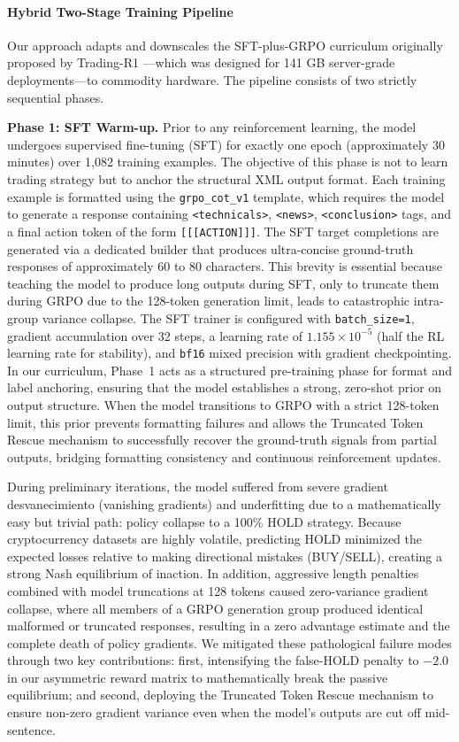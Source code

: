     \paragraph{Hybrid Two-Stage Training Pipeline}

    Our approach adapts and downscales the SFT-plus-GRPO curriculum originally proposed by Trading-R1 \cite{xiao2025tradingr1}---which was designed for 141 GB server-grade deployments---to commodity hardware. The pipeline consists of two strictly sequential phases.

    \textbf{Phase 1: SFT Warm-up.} Prior to any reinforcement learning, the model undergoes supervised fine-tuning (SFT) for exactly one epoch (approximately 30 minutes) over 1,082 training examples. The objective of this phase is not to learn trading strategy but to anchor the structural XML output format. Each training example is formatted using the \texttt{grpo\_cot\_v1} template, which requires the model to generate a response containing \texttt{<technicals>}, \texttt{<news>}, \texttt{<conclusion>} tags, and a final action token of the form \texttt{[[[ACTION]]]}. The SFT target completions are generated via a dedicated builder that produces ultra-concise ground-truth responses of approximately 60 to 80 characters. This brevity is essential because teaching the model to produce long outputs during SFT, only to truncate them during GRPO due to the 128-token generation limit, leads to catastrophic intra-group variance collapse. The SFT trainer is configured with \texttt{batch\_size=1}, gradient accumulation over 32 steps, a learning rate of $1.155\times10^{-5}$ (half the RL learning rate for stability), and \texttt{bf16} mixed precision with gradient checkpointing. In our curriculum, Phase~1 acts as a structured pre-training phase for format and label anchoring, ensuring that the model establishes a strong, zero-shot prior on output structure. When the model transitions to GRPO with a strict 128-token limit, this prior prevents formatting failures and allows the Truncated Token Rescue mechanism to successfully recover the ground-truth signals from partial outputs, bridging formatting consistency and continuous reinforcement updates.

    During preliminary iterations, the model suffered from severe gradient desvanecimiento (vanishing gradients) and underfitting due to a mathematically easy but trivial path: policy collapse to a 100\% HOLD strategy. Because cryptocurrency datasets are highly volatile, predicting HOLD minimized the expected losses relative to making directional mistakes (BUY/SELL), creating a strong Nash equilibrium of inaction. In addition, aggressive length penalties combined with model truncations at 128 tokens caused zero-variance gradient collapse, where all members of a GRPO generation group produced identical malformed or truncated responses, resulting in a zero advantage estimate and the complete death of policy gradients. We mitigated these pathological failure modes through two key contributions: first, intensifying the false-HOLD penalty to $-2.0$ in our asymmetric reward matrix to mathematically break the passive equilibrium; and second, deploying the Truncated Token Rescue mechanism to ensure non-zero gradient variance even when the model's outputs are cut off mid-sentence.
    
